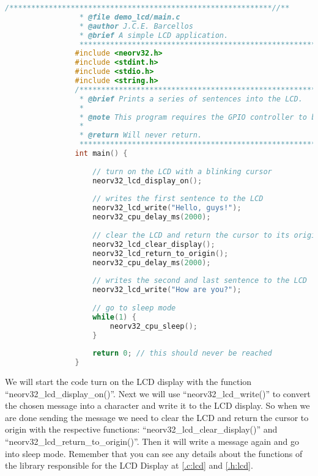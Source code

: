             \begin{lstlisting}[style=mystyle_c, language=c, breaklines]
                /************************************************************//**
                 * @file demo_lcd/main.c
                 * @author J.C.E. Barcellos
                 * @brief A simple LCD application.
                 ***************************************************************/
                #include <neorv32.h>
                #include <stdint.h>
                #include <stdio.h>
                #include <string.h>
                /************************************************************//**
                 * @brief Prints a series of sentences into the LCD.
                 *
                 * @note This program requires the GPIO controller to be synthesized.
                 *
                 * @return Will never return.
                 ***************************************************************/
                int main() {
                
                	// turn on the LCD with a blinking cursor
                	neorv32_lcd_display_on(); 
                
                	// writes the first sentence to the LCD
                	neorv32_lcd_write("Hello, guys!"); 
                	neorv32_cpu_delay_ms(2000);
                
                	// clear the LCD and return the cursor to its origin
                	neorv32_lcd_clear_display(); 
                	neorv32_lcd_return_to_origin(); 
                	neorv32_cpu_delay_ms(2000);
                
                	// writes the second and last sentence to the LCD
                	neorv32_lcd_write("How are you?"); 
                
                	// go to sleep mode
                    while(1) {
                        neorv32_cpu_sleep();
                    }
                	
                	return 0; // this should never be reached
                }        
        \end{lstlisting}

            We will start the code turn on the LCD display with the function ``neorv32\_lcd\_display\_on()''. Next we will use ``neorv32\_lcd\_write()'' to convert the chosen message into a character and write it to the LCD display. So when we are done sending the message we need to clear the LCD and return the cursor to origin with the respective functions: ``neorv32\_lcd\_clear\_display()'' and ``neorv32\_lcd\_return\_to\_origin()''. Then it will write a message again and go into sleep mode.
            Remember that you can see any details about the functions of the library responsible for the LCD Display at \autoref{.c:lcd} and \autoref{.h:lcd}.
    
